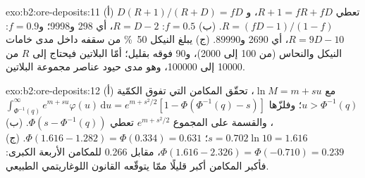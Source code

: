 \begin{solution}{exo:b2:ore-deposits:11}
(أ) $D(R + 1)/(R + D) = fD$ تعطي $R + 1 = fR + fD$، و$R = (fD - 1)/(1 - f)$. (ب) $f = 0.5$: $R = D - 2$،
أي 298 و\num{9998}؛ و$f = 0.9$: $R = 9D - 10$، أي \num{2690} و\num{89990}. (ج) يبلغ النيكل
\qty{50}{\percent} من سقفه داخل مدى خامات النيكل والنحاس (من 100 إلى \num{2000})، و90 فوقه بقليل؛
أمّا البلاتين فيحتاج إلى $R$ من \num{10000} إلى \num{100000}، وهو مدى حيود عناصر مجموعة البلاتين.
\end{solution}

\begin{solution}{exo:b2:ore-deposits:12}
(أ) مع $\ln M = m + s u$، تحقّق المكامن التي تفوق الكمّية $u > \Phi^{-1}(q)$؛ وفلزّها
$\int_{\Phi^{-1}(q)}^{\infty} e^{m + su}\varphi(u)\,\mathrm{d}u = e^{m + s^2/2}[1 - \Phi(\Phi^{-1}(q) -
s)]$، والقسمة على المجموع $e^{m + s^2/2}$ تعطي $\Phi(s - \Phi^{-1}(q))$. (ب) $s = 0.702 \ln 10 =
1.616$؛ $\Phi(1.616 - 1.282) = \Phi(0.334) = 0.631$. (ج) $\Phi(1.616 - 2.326) = \Phi(-0.710) = 0.239$،
مقابل 0.266 للمكامن الأربعة الكبرى: فأكبر المكامن أكبر قليلًا ممّا يتوقّعه القانون
اللوغاريتمي الطبيعي.
\end{solution}


